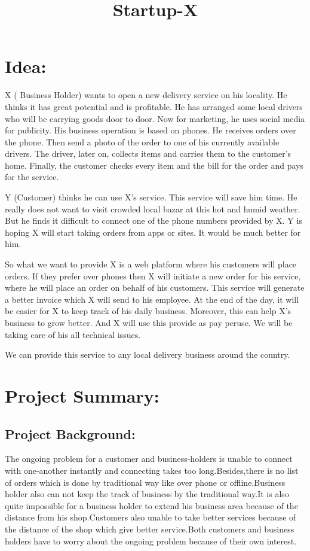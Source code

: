 \documentclass[13pt]{extarticle}
\title{Startup-X}
\date{}
\begin{document}
\tableofcontents

\newpage
\maketitle{}
\section{\textbf{Idea:} }

\quad X ( Business Holder) wants to open a new delivery service on his locality. He thinks it has great potential and is profitable. He has arranged some local drivers who will be carrying goods door to door. Now for marketing, he uses social media for publicity. His business operation is based on phones. He receives orders over the phone. Then send a photo of the order to one of his currently available drivers. The driver, later on, collects items and carries them to the customer’s home. Finally, the customer checks every item and the bill for the order and pays for the service. 

Y (Customer) thinks he can use X’s service. This service will save him time. He really does not want to visit crowded local bazar at this hot and humid weather. But he finds it difficult to connect one of the phone numbers provided by X. Y is hoping X will start taking orders from apps or sites. It would be much better for him. 

 So what we want to provide X is a web platform where his customers will place orders. If they prefer over phones then X will initiate a new order for his service, where he will place an order on behalf of his customers. This service will generate a better invoice which X will send to his employee. At the end of the day, it will be easier for X to keep track of his daily business. Moreover, this can help X’s business to grow better. And X will use this provide as pay peruse. We will be taking care of his all technical issues. 

We can provide this service to any local delivery business around the country.
\newpage
\section{\textbf{Project Summary:}}
\subsection{Project Background:}
\quad The ongoing problem for a customer and business-holders is unable to connect with one-another instantly and connecting takes too long.Besides,there is no list of orders which is done by traditional way like over phone or offline.Business holder also can not keep the track of business by the traditional way.It is also quite impossible for a business holder to extend his business area because of the distance from his shop.Customers also unable to take better services because of the distance of the shop which give better service.Both customers and business holders have to worry about the ongoing problem because of their own interest.
\end{document}
